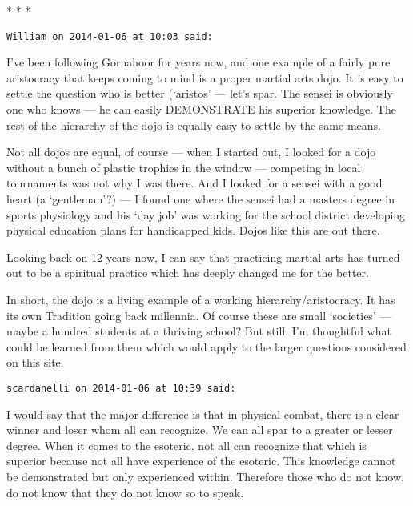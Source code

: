 
\begin{center}* * *\end{center}

\begin{footnotesize}\begin{sffamily}



\texttt{William on 2014-01-06 at 10:03 said: }

I've been following Gornahoor for years now, and one example of a fairly pure aristocracy that keeps coming to mind is a proper martial arts dojo. It is easy to settle the question who is better (`aristos’ — let's spar. The sensei is obviously one who knows — he can easily DEMONSTRATE his superior knowledge. The rest of the hierarchy of the dojo is equally easy to settle by the same means. 

Not all dojos are equal, of course — when I started out, I looked for a dojo without a bunch of plastic trophies in the window — competing in local tournaments was not why I was there. And I looked for a sensei with a good heart (a `gentleman’?) — I found one where the sensei had a masters degree in sports physiology and his `day job' was working for the school district developing physical education plans for handicapped kids. Dojos like this are out there.

Looking back on 12 years now, I can say that practicing martial arts has turned out to be a spiritual practice which has deeply changed me for the better. 

In short, the dojo is a living example of a working hierarchy/aristocracy. It has its own Tradition going back millennia. Of course these are small `societies’ — maybe a hundred students at a thriving school? But still, I'm thoughtful what could be learned from them which would apply to the larger questions considered on this site.


\hfill

\texttt{scardanelli on 2014-01-06 at 10:39 said: }

I would say that the major difference is that in physical combat, there is a clear winner and loser whom all can recognize. We can all spar to a greater or lesser degree. When it comes to the esoteric, not all can recognize that which is superior because not all have experience of the esoteric. This knowledge cannot be demonstrated but only experienced within. Therefore those who do not know, do not know that they do not know so to speak.


\end{sffamily}
\end{footnotesize}
